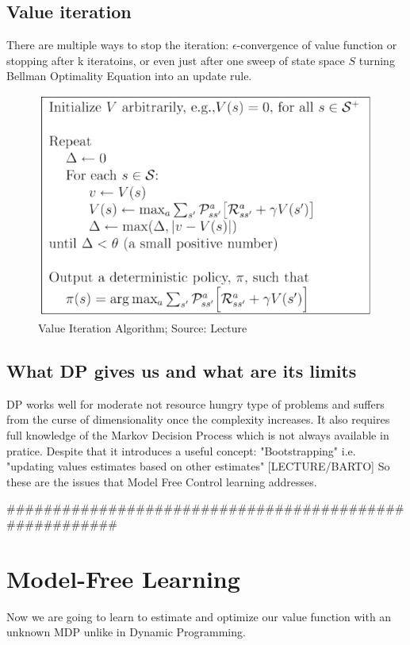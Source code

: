 \subsection{Value iteration}

There are multiple ways to stop the iteration: $\epsilon$-convergence of value function or stopping after k iteratoins, or even just after one sweep of state space $S$ turning Bellman Optimality Equation into an update rule. 

\begin{figure}[h!]
  \centering
  \includegraphics[scale=0.5]{figures/value_iteration_algorithm.PNG}
  \caption{Value Iteration Algorithm; Source: Lecture}
  \label{fig:via}
\end{figure}

\subsection{What DP gives us and what are its limits}

DP works well for moderate not resource hungry type of problems and suffers from the curse of dimensionality once the complexity increases. It also requires full knowledge of the Markov Decision Process which is not always available in pratice. Despite that it introduces a useful concept: "Bootstrapping" i.e. "updating values estimates based on other estimates" [LECTURE/BARTO] So these are the issues that Model Free Control learning addresses.


#######################################################

\section{Model-Free Learning}
Now we are going to learn to estimate and optimize our value function with an unknown MDP unlike in Dynamic Programming. 

